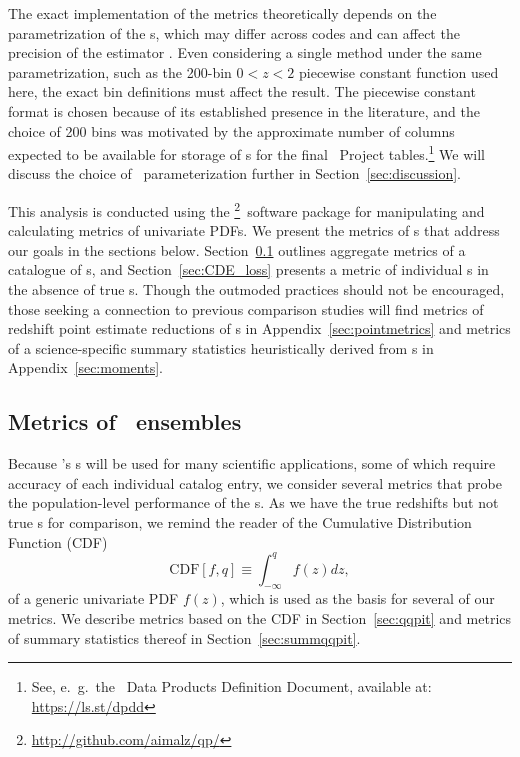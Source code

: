 The exact implementation of the metrics theoretically depends on the parametrization of the \pzpdf s, which may differ across codes and can affect the precision of the estimator \citep{Malz:2018}.
Even considering a single method under the same parametrization, such as the 200-bin $0 < z < 2$ piecewise constant function used here, the exact bin definitions must affect the result.
The piecewise constant format is chosen because of its established presence in the literature, and the choice of 200 bins was motivated by the approximate number of columns expected to be available for storage of \pzpdf s for the final \lsst\ Project tables.\footnote{See, e.~g.~the \lsst\ Data Products Definition Document, available at: \url{https://ls.st/dpdd}}
We will discuss the choice of \pzpdf\ parameterization further in Section~\ref{sec:discussion}.

This analysis is conducted using the \qp\footnote{\url{http://github.com/aimalz/qp/}}\ software package \citep{Malz:qp} for manipulating and calculating metrics of univariate PDFs.
We present the metrics of \pzpdf s that address our goals in the sections below.
Section~\ref{sec:qualmet} outlines aggregate metrics of a catalogue of \pzpdf s, and Section~\ref{sec:CDE_loss} presents a metric of individual \pzpdf s in the absence of true \pzpdf s.
Though the outmoded practices should not be encouraged, those seeking a connection to previous comparison studies will find metrics of redshift point estimate reductions of \pzpdf s in Appendix~\ref{sec:pointmetrics} and metrics of a science-specific summary statistics heuristically derived from \pzpdf s in Appendix~\ref{sec:moments}.

\subsection{Metrics of \pzpdf \ ensembles}
\label{sec:qualmet}

Because \lsst's \pzpdf s will be used for many scientific applications, some of which require accuracy of each individual catalog entry, we consider several metrics that probe the population-level performance of the \pzpdf s.
As we have the true redshifts but not true \pzpdf s for comparison, we remind the reader of the Cumulative Distribution Function (CDF)
\begin{equation}
  \label{eq:cdf}
  \mathrm{CDF}[f, q] \equiv \int_{-\infty}^{q} f(z) dz,
\end{equation}
of a generic univariate PDF $f(z)$, which is used as the basis for several of our metrics.
We describe metrics based on the CDF in Section~\ref{sec:qqpit} and metrics of summary statistics thereof in Section~\ref{sec:summqqpit}.

